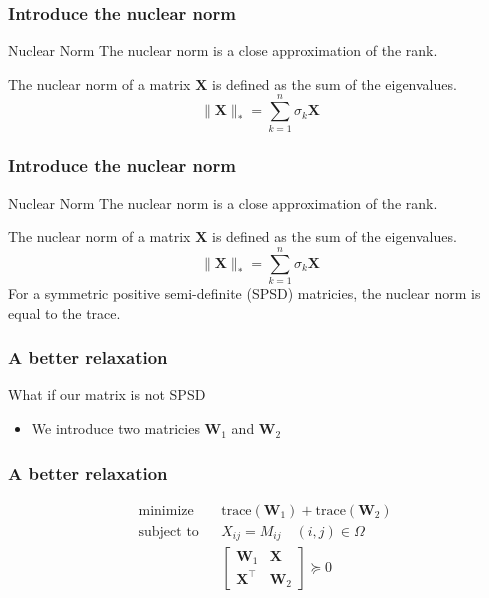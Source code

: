 \documentclass[
	11pt, %
]{beamer}
\begin{document}
\begin{frame}
	\frametitle{Introduce the nuclear norm}
	\vspace{-4em}
	\begin{block}{Nuclear Norm}
		The nuclear norm is a close approximation of the rank.
	\end{block}
	\vspace{2em}
	
	The nuclear norm of a matrix $\mathbf{X}$ is defined as the sum of 
	the eigenvalues.
	\[
	\lVert \mathbf{X} \rVert_* = \sum_{k=1}^n \sigma_k {\mathbf{X}}  
	\]
\end{frame}

\begin{frame}
	\frametitle{Introduce the nuclear norm}
	\vspace{-4em}
	\begin{block}{Nuclear Norm}
		The nuclear norm is a close approximation of the rank.
	\end{block}
	\vspace{2em}
	
	The nuclear norm of a matrix $\mathbf{X}$ is defined as the sum of 
	the eigenvalues.
	\[
	\lVert \mathbf{X} \rVert_* = \sum_{k=1}^n \sigma_k {\mathbf{X}}  
	\]
	For a symmetric positive semi-definite (SPSD) matricies, the nuclear norm is equal to the trace. 
\end{frame}


\begin{frame}
	\frametitle{A better relaxation}
	What if our matrix is not SPSD
	\begin{itemize}
		\item We introduce two matricies $\mathbf{W}_1$ and $\mathbf{W}_2$ 
	\end{itemize}
\end{frame}

\begin{frame}
	\frametitle{A better relaxation}

	\begin{equation*}
		\begin{aligned}
		& {\text{minimize}}
		& & \text{trace}(\mathbf{W}_1) + \text{trace}(\mathbf{W}_2) \\[1pt]
		& \text{subject to}
		& & X_{ij} = M_{ij} \quad (i,j) \in \Omega\\[1pt]
		&&& \begin{bmatrix} 
		  \mathbf{W}_1 & \mathbf{X} \\
		  \mathbf{X}^\top & \mathbf{W}_2
		\end{bmatrix} \succeq 0 
		\end{aligned}
	  \end{equation*}	
\end{frame}
\end{document}
